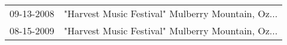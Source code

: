 \begin{supertabular}{ll}
 09-13-2008 &  "Harvest Music Festival" Mulberry Mountain, Oz... \\
 08-15-2009 &  "Harvest Music Festival" Mulberry Mountain, Oz... \\
\end{supertabular}
